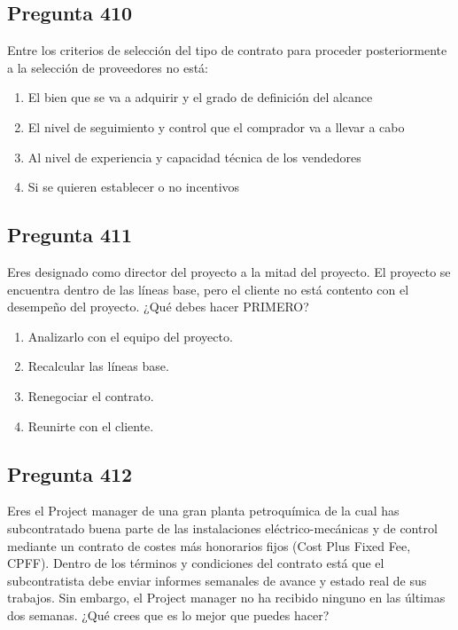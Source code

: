 \documentclass[11pt,a4paper]{article}
\begin{document}
\subsection*{Pregunta 410}
Entre los criterios de selección del tipo de contrato para proceder posteriormente a la selección de proveedores no está:

\begin{enumerate}[label=\alph*)]
  \item El bien que se va a adquirir y el grado de definición del alcance
  \item El nivel de seguimiento y control que el comprador va a llevar a cabo
  \item Al nivel de experiencia y capacidad técnica de los vendedores
  \item Si se quieren establecer o no incentivos
\end{enumerate}

\subsection*{Pregunta 411}
Eres designado como director del proyecto a la mitad del proyecto. El proyecto se encuentra dentro de las líneas base, pero el cliente no está contento con el desempeño del proyecto. ¿Qué debes hacer PRIMERO?

\begin{enumerate}[label=\alph*)]
  \item Analizarlo con el equipo del proyecto.
  \item Recalcular las líneas base.
  \item Renegociar el contrato.
  \item Reunirte con el cliente.
\end{enumerate}

\subsection*{Pregunta 412}
Eres el Project manager de una gran planta petroquímica de la cual has subcontratado buena parte de las instalaciones eléctrico-mecánicas y de control mediante un contrato de costes más honorarios fijos (Cost Plus Fixed Fee, CPFF). Dentro de los términos y condiciones del contrato está que el subcontratista debe enviar informes semanales de avance y estado real de sus trabajos. Sin embargo, el Project manager no ha recibido ninguno en las últimas dos semanas. ¿Qué crees que es lo mejor que puedes hacer?
\end{document}
